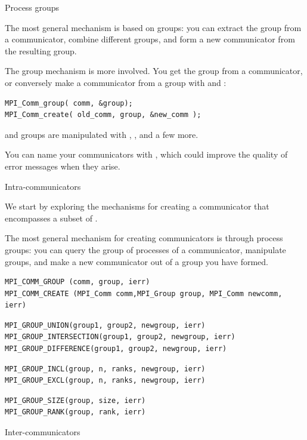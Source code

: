  {Process groups}

The most general mechanism is based on groups: you can extract the
group from a communicator, combine different groups, and form a new
communicator from the resulting group.

The group mechanism is more involved. You get the group from a
communicator, or conversely make a communicator from a group with
 and :
\begin{verbatim}
MPI_Comm_group( comm, &group);
MPI_Comm_create( old_comm, group, &new_comm );
\end{verbatim}
and groups are manipulated with
, ,
 and a few more.

You can name your communicators with , which
could improve the quality of error messages when they arise.

 {Intra-communicators}
\label{sec:comm-group}

We start by exploring the mechanisms for creating a communicator that
encompasses a subset of . 

The most general mechanism for creating communicators is through
process groups: you can query the group of processes of a
communicator, manipulate groups, and make a new communicator out of a
group you have formed.

\begin{verbatim}
MPI_COMM_GROUP (comm, group, ierr)
MPI_COMM_CREATE (MPI_Comm comm,MPI_Group group, MPI_Comm newcomm, ierr)
\end{verbatim}

\begin{verbatim}
MPI_GROUP_UNION(group1, group2, newgroup, ierr)
MPI_GROUP_INTERSECTION(group1, group2, newgroup, ierr)
MPI_GROUP_DIFFERENCE(group1, group2, newgroup, ierr)
\end{verbatim}

\begin{verbatim}
MPI_GROUP_INCL(group, n, ranks, newgroup, ierr)
MPI_GROUP_EXCL(group, n, ranks, newgroup, ierr)
\end{verbatim}
\begin{verbatim}
MPI_GROUP_SIZE(group, size, ierr)
MPI_GROUP_RANK(group, rank, ierr)
\end{verbatim}

 {Inter-communicators}

